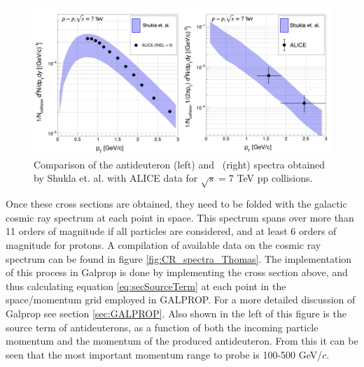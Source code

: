 \begin{figure}
    \centering
    \includegraphics[width=\textwidth]{figures/production_xs_ALICE_comparison.png}
    \caption{Comparison of the antideuteron (left) and \ahe\ (right) spectra obtained by Shukla et. al. with ALICE data for $\sqrt{s}=7$ TeV pp collisions.}
    \label{fig:prod_v_ALICE}
\end{figure}

Once these cross sections are obtained, they need to be folded with the galactic cosmic ray spectrum at each point in space. This spectrum spans over more than 11 orders of magnitude if all particles are considered, and at least 6 orders of magnitude for protons. A compilation of available data on the cosmic ray spectrum can be found in figure \ref{fig:CR_spectra_Thomas}. The implementation of this process in Galprop is done by implementing the cross section above, and thus calculating equation \ref{eq:secSourceTerm} at each point in the space/momentum grid employed in GALPROP. For a more detailed discussion of Galprop see section \ref{sec:GALPROP}. Also shown in the left of this figure is the source term of antideuterons, as a function of both the incoming particle momentum and the momentum of the produced antideuteron. From this it can be seen that the most important momentum range to probe is 100-500 GeV/$c$. 

